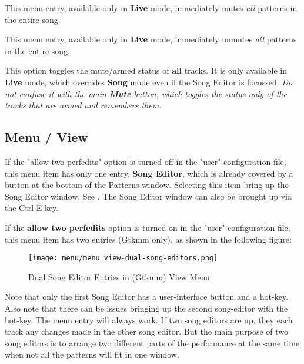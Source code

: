    This menu entry, available only in \textbf{Live} mode,
   immediately mutes \textsl{all} patterns in the entire song.

   This menu entry, available only in \textbf{Live} mode,
   immediately unmutes \textsl{all} patterns in the entire song.

   This option toggles the mute/armed status of \textbf{all} tracks.
   It is only available in \textbf{Live} mode, which overrides \textbf{Song}
   mode even if the Song Editor is focussed.
   \textsl{Do not confuse it with the main \textbf{Mute} button, which toggles the
   status only of the tracks that are armed and remembers them.}

\subsection{Menu / View}
\label{subsec:seq64_menu_view}

   If the "allow two perfedits" option is turned off in the "user"
   configuration file, this menu item has only one entry, \textbf{Song Editor}, 
   which is already covered by a button at the bottom of the Patterns
   window.  Selecting this item bring up the Song Editor window.
   See .
   The Song Editor window can also be brought up via the
   Ctrl-E key.

   If the \textbf{allow two perfedits} option is turned on in the "user"
   configuration file, this menu item has two entries (Gtkmm only),
   as shown in the following figure:

\begin{figure}[H]
   \centering 
   \texttt{[image: menu/menu\_view-dual-song-editors.png]}
   \caption{Dual Song Editor Entries in (Gtkmm) View Menu}
   \label{fig:seq64_menu_view_song_editors}
\end{figure}

   Note that only the first Song Editor has a user-interface button and
   a hot-key.  Also note that there can be issues bringing up the second
   song-editor with the hot-key.  The menu entry will always work.
   If two song editors are up, they each track any changes made in the other
   song editor.  But the main purpose of two song editors is to arrange two
   different parts of the performance at the same time when not all the
   patterns will fit in one window.

